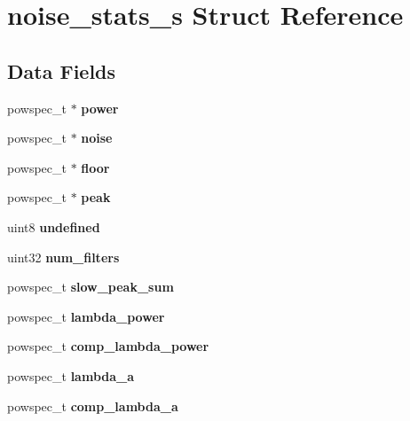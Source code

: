 \section{noise\+\_\+stats\+\_\+s Struct Reference}
\label{structnoise__stats__s}
\subsection*{Data Fields}
\begin{DoxyCompactItemize}
\item 
powspec\+\_\+t $\ast$ {\bfseries power}\label{structnoise__stats__s_a3352c66489d54b578e5f43cc646951dc}

\item 
powspec\+\_\+t $\ast$ {\bfseries noise}\label{structnoise__stats__s_ab21b71b8202302859b120b08b42bb4bb}

\item 
powspec\+\_\+t $\ast$ {\bfseries floor}\label{structnoise__stats__s_aea4aaa0528b85a2989743afee3f21964}

\item 
powspec\+\_\+t $\ast$ {\bfseries peak}\label{structnoise__stats__s_a36e6b3a83014d30755b763fa8575a35d}

\item 
uint8 {\bfseries undefined}\label{structnoise__stats__s_a84138e0f5dd6bc3c8049cce8ea815678}

\item 
uint32 {\bfseries num\+\_\+filters}\label{structnoise__stats__s_ad5b17abb96cc825153b41f1506018c3c}

\item 
powspec\+\_\+t {\bfseries slow\+\_\+peak\+\_\+sum}\label{structnoise__stats__s_a9038ab6afc8ff2df63952cc16d032f0d}

\item 
powspec\+\_\+t {\bfseries lambda\+\_\+power}\label{structnoise__stats__s_aae414a12fd0b4b8be3a61468fe15f3de}

\item 
powspec\+\_\+t {\bfseries comp\+\_\+lambda\+\_\+power}\label{structnoise__stats__s_a7d2228c947b372142346861adbf16acb}

\item 
powspec\+\_\+t {\bfseries lambda\+\_\+a}\label{structnoise__stats__s_a804b3c775a7d80c95a2a53e9eb0d6b3a}

\item 
powspec\+\_\+t {\bfseries comp\+\_\+lambda\+\_\+a}\label{structnoise__stats__s_a047be8fb044da7e3a3f45b78e9d5de23}


\end{DoxyCompactItemize}
